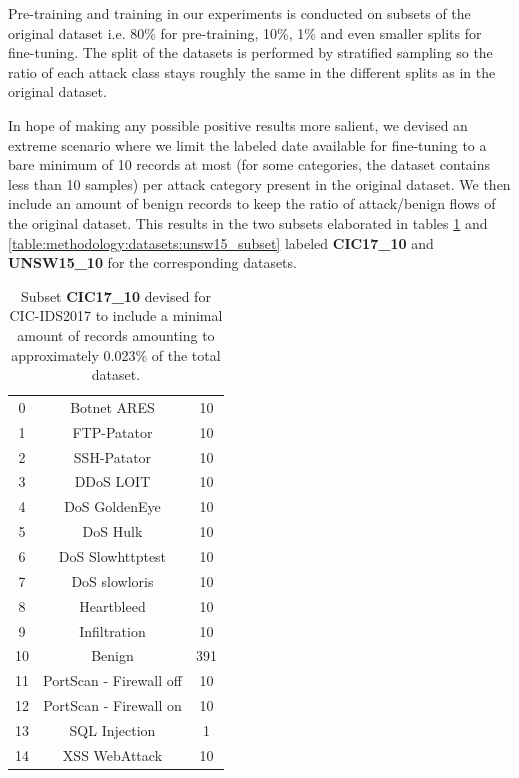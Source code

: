 Pre-training and training in our experiments is conducted on subsets of the original dataset i.e. 80\% for pre-training, 10\%, 1\% and even smaller splits for fine-tuning. The split of the datasets is performed by stratified sampling so the ratio of each attack class stays roughly the same in the different splits as in the original dataset. \par

In hope of making any possible positive results more salient, we devised an extreme scenario where we limit the labeled date available for fine-tuning to a bare minimum of 10 records at most (for some categories, the dataset contains less than 10 samples) per attack category present in the original dataset. We then include an amount of benign records to keep the ratio of attack/benign flows of the original dataset. This results in the two subsets elaborated in tables \ref{table:methodology:datasets:cic17_subset} and \ref{table:methodology:datasets:unsw15_subset} labeled \textbf{CIC17\_10} and \textbf{UNSW15\_10} for the corresponding datasets.

\begin{table}[H]
	\centering
	\begin{tabular}{ccc}
		\thead{\textbf{\#}} & \thead{\textbf{Class}} & \thead{\textbf{No. Records}} \\ \hline \midrule
		0  & Botnet ARES             & 10  \\
		1  & FTP-Patator             & 10  \\
		2  & SSH-Patator             & 10  \\
		3  & DDoS LOIT               & 10  \\
		4  & DoS GoldenEye           & 10  \\
		5  & DoS Hulk                & 10  \\
		6  & DoS Slowhttptest        & 10  \\
		7  & DoS slowloris           & 10  \\
		8  & Heartbleed              & 10  \\
		9  & Infiltration            & 10  \\
		10 & Benign                  & 391 \\
		11 & PortScan - Firewall off & 10  \\
		12 & PortScan - Firewall on  & 10  \\
		13 & SQL Injection           & 1   \\
		14 & XSS WebAttack           & 10                    
	\end{tabular}
	\caption{Subset \textbf{CIC17\_10} devised for CIC-IDS2017 to include a minimal amount of records amounting to approximately 0.023\% of the total dataset.}
	\label{table:methodology:datasets:cic17_subset}
\end{table}

